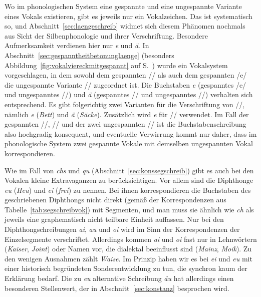 Wo im phonologischen System eine gespannte und eine ungespannte Variante eines Vokals existieren, gibt es jeweils nur ein Vokalzeichen.
Das ist systematisch so, und Abschnitt~\ref{sec:laengeschreib} widmet sich diesem Phänomen nochmals aus Sicht der Silbenphonologie und ihrer Verschriftung.
Besondere Aufmerksamkeit verdienen hier nur \textit{e} und \textit{ä}.
In Abschnitt~\ref{sec:gespanntheitbetonunglaenge} (besonders Abbildung~\ref{fig:vokalviereckmitgespannt} auf S.~\pageref{fig:vokalviereckmitgespannt}) wurde ein Vokalsystem vorgeschlagen, in dem sowohl dem gespannten // als auch dem gespannten /e/ die ungespannte Variante // zugeordnet ist.
Die Buchstaben \textit{e} (gespanntes /e/ und ungespanntes //) und \textit{ä} (gespanntes // und ungespanntes //) verhalten sich entsprechend.
Es gibt folgerichtig zwei Varianten für die Verschriftung von //, nämlich \textit{e} (\textit{Bett}) und \textit{ä} (\textit{Säcke}).
Zusätzlich wird \textit{e} für // verwendet.
Im Fall der gespannten //, // und der zwei ungespannten // ist die Buchstabenschreibung also hochgradig konsequent, und eventuelle Verwirrung kommt nur daher, dass im phonologische System zwei gespannte Vokale mit demselben ungespannten Vokal korrespondieren.

Wie im Fall von \textit{chs} und \textit{qu} (Abschnitt~\ref{sec:konssegschreib}) gibt es auch bei den Vokalen kleine Extravaganzen zu berücksichtigen.
Vor allem sind die Diphthonge \textit{eu} (\textit{Heu}) und \textit{ei} (\textit{frei}) zu nennen.
Bei ihnen korrespondieren die Buchstaben des geschriebenen Diphthongs nicht direkt (gemäß der Korrespondenzen aus Tabelle~\ref{tab:segschreibvok}) mit Segmenten, und man muss sie ähnlich wie \textit{ch} als jeweils eine graphematisch nicht teilbare Einheit auffassen.
Nur bei den Diphthongschreibungen \textit{ai}, \textit{au} und \textit{oi} wird im Sinn der Korrespondenzen der Einzelsegmente verschriftet.
Allerdings kommen \textit{ai} und \textit{oi} fast nur in Lehnwörtern (\textit{Kaiser}, \textit{Joint}) oder Namen vor, die dialektal beeinflusst sind (\textit{Mainz}, \textit{Moik}).
Zu den wenigen Ausnahmen zählt \textit{Waise}.
Im Prinzip haben wir es bei \textit{ei} und \textit{eu} mit einer historisch begründeten Sonderentwicklung zu tun, die synchron kaum der Erklärung bedarf.
Die zu \textit{eu} alternative Schreibung \textit{äu} hat allerdings einen besonderen Stellenwert, der in Abschnitt~\ref{sec:konstanz} besprochen wird.


